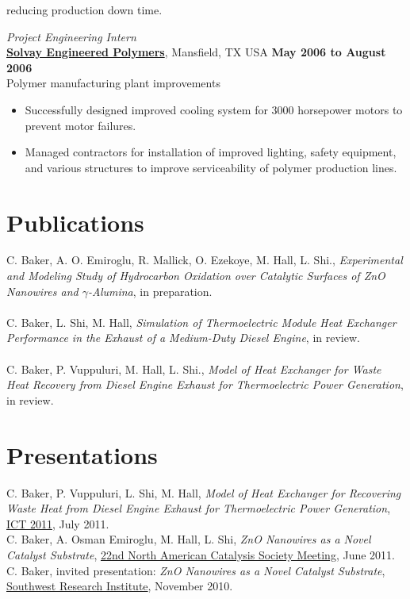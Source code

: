 \documentclass[centered]{res}
\begin{document}
\begin{resume}
\begin{itemize}
  reducing production down time.
\end{itemize} \vspace{-8pt}
%
\textit{Project Engineering Intern} \\
\href{http://www.lyondellbasell.com/LandingPages/SolvayEngineeredPolymers}{\textbf{Solvay
    Engineered Polymers}}, Mansfield, TX USA 
\hfill \textbf{May 2006 to August 2006} \\
Polymer manufacturing plant improvements 
\begin{itemize} \itemsep -2pt %
\item Successfully designed improved cooling system for 3000
  horsepower motors to prevent motor failures.
\item Managed contractors for installation of improved lighting,
  safety equipment, and various structures to improve serviceability
  of polymer production lines.
\end{itemize} 
%
\section{Publications}

C. Baker, A. O. Emiroglu, R. Mallick, O. Ezekoye, M. Hall, L. Shi.,
\textit{Experimental and Modeling Study of Hydrocarbon Oxidation over
  Catalytic Surfaces of ZnO Nanowires and $\gamma$-Alumina}, in
preparation. \\
\vspace{-5pt} \\
%
C. Baker, L. Shi, M. Hall, \textit{Simulation of Thermoelectric
  Module Heat Exchanger Performance in the Exhaust of a Medium-Duty
  Diesel Engine}, in review.  \\
\vspace{-5pt} \\
%
C. Baker, P. Vuppuluri, M. Hall, L. Shi., \textit{Model of Heat
  Exchanger for Waste Heat Recovery from Diesel Engine Exhaust for
  Thermoelectric Power Generation}, in review.  

\section{Presentations}

C. Baker, P. Vuppuluri, L. Shi, M. Hall, \textit{Model of Heat
  Exchanger for Recovering Waste Heat from Diesel Engine Exhaust for
  Thermoelectric Power Generation},
\href{http://ict2011.its.org/}{ICT 2011}, July 2011. 
\vspace{5pt} \\
C. Baker, A. Osman Emiroglu, M. Hall, L. Shi, \textit{ZnO
  Nanowires as a Novel Catalyst Substrate},
\href{http://www.22nam.org/}{22nd North
  American Catalysis Society Meeting}, June 2011. 
\vspace{5pt} \\
C. Baker, invited presentation: \textit{ZnO Nanowires as
  a Novel Catalyst Substrate},
\href{http://www.swri.org/4org/d03/d03home.htm}%
{Southwest Research Institute}, November 2010.


\end{resume}
\end{document}
